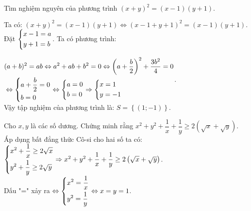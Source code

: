 \begin{ex}%
	Tìm nghiệm nguyên của phương trình $(x+y)^2=(x-1)(y+1)$.
\loigiai
    {Ta có:
    $(x+y)^2=(x-1)(y+1)\Leftrightarrow \left(x-1+y+1\right)^2=\left(x-1\right)(y+1)$.\\
    Đặt $\left\{\begin{aligned}&x-1=a\\&y+1=b\end{aligned}\right.$. Ta có phương trình:
    
    $\begin{aligned}
    &(a+b)^2=ab\Leftrightarrow a^2+ab+b^2=0\Leftrightarrow \left(a+\dfrac{b}{2}\right)^2+\dfrac{3b^2}{4}=0\\&
    \Leftrightarrow \left\{\begin{aligned}&a+\dfrac{b}{2}=0\\&b=0\end{aligned}\right.\Leftrightarrow \left\{\begin{aligned}&a=0\\&b=0\end{aligned}\right.\Rightarrow\left\{\begin{aligned}&x=1\\&y=-1\end{aligned}\right.
    \end{aligned}
    $.\\
    Vậy tập nghiệm của phương trình là: $S=\left\{(1;-1)\right\}$.
    }
\end{ex}
\begin{ex}%
	Cho $x,y$ là các số dương. Chứng minh rằng $x^2+y^2+\dfrac{1}{x}+\dfrac{1}{y}\ge 2\left(\sqrt{x}+\sqrt{y}\right)$.
\loigiai
    {Áp dụng bất đẳng thức Cô-si cho hai số ta có:\\
    $\left\{\begin{aligned}&x^2+\dfrac{1}{x}\ge 2\sqrt{x}\\&y^2+\dfrac{1}{y}\ge 2\sqrt{y}\end{aligned}\right.\Rightarrow x^2+y^2+\dfrac{1}{x}+\dfrac{1}{y}\ge 2\left(\sqrt{x}+\sqrt{y}\right)$.\\
    Dấu "=" xảy ra $\Leftrightarrow \left\{\begin{aligned}&x^2=\dfrac{1}{x}\\&y^2=\dfrac{1}{y}\end{aligned}\right.\Leftrightarrow x=y=1$.
    }
\end{ex}
